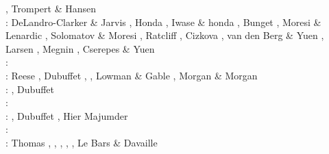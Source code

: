 \begin{scriptsize}
                    \cite{buri96}\cite{schh96}, Trompert \& Hansen \cite{trha96}\\
\nineteenninetyseven: DeLandro-Clarker \& Jarvis \cite{deja97}, Honda \cite{hond97}, 
                      Iwase \& honda \cite{iwho97}, Bunget \etal \cite{burb97},
                      Moresi \& Lenardic \cite{mole97}, Solomatov \& Moresi \cite{somo97},
                      Ratcliff \etal \cite{rats97}, Cizkova \etal \cite{cicv97},
                      van den Berg \& Yuen \cite{vayu97}, Larsen \etal \cite{laym97},
                      Megnin \etal \cite{mebr97}, Cserepes \& Yuen \cite{csyu97}\\
\nineteenninetyeight: \cite{ande98}\cite{iwho98}\cite{devv98}\cite{tack98}\cite{tack98b}\cite{trha98b}
      \cite{trha98}\cite{burl98}\cite{mokm98}\cite{lena98}\cite{vayu98}\cite{wema98}\\
\nineteenninetynine: Reese \etal \cite{resb99}, Dubuffet \etal \cite{duyr99}, 
                     \cite{vazh99}\cite{dava99}
                     \cite{tabg99}\cite{como99}
                     \cite{cicv99}\cite{trrj99},
                     Lowman \& Gable \cite{loga99}, Morgan \& Morgan \cite{momo99}\\ 
\twothousand: \cite{albe00}\cite{hayu00}
              \cite{devv00b}\cite{tack00}
              \cite{tack00b}\cite{tack00c}
              \cite{tack00d}\cite{zhzm00}
              \cite{legm00}\cite{conr00}
              \cite{somo00},  Dubuffet \etal \cite{duyu00,duyy00}\\
\twothousandone: \cite{vank01}\cite{riyb01}
                 \cite{lemo01}\cite{vays01}
                 \cite{moqu01}\cite{zhon01}
                 \cite{burm01}\cite{dabu01}\\
\twothousandtwo: \cite{tasu02}\cite{modm02}
                 \cite{tack02}\cite{vaya02}
                 \cite{vayu02}\cite{taxi02}
                 \cite{scbh02}\cite{strb02}, 
                 Dubuffet \etal \cite{duyr02}, Hier Majumder \etal{} \cite{hiys02}\\
\twothousandthree: \cite{hapa03}\cite{lemo03}
                   \cite{mumc03}\cite{fasa03}
                   \cite{heta03}\cite{sibu03}
                   \cite{ogaw03,ogaw03b}\\
\twothousandfour: Thomas \etal \cite{thkl04}, \cite{vavv04b}
                  \cite{xita04b}\cite{xita04},
                  \cite{nata04b}\cite{vayr04},
                  \cite{brws04}\cite{stsh04},
                  \cite{scbh04}, Le Bars \& Davaille \cite{leda04,leda04b} \\

\end{scriptsize}
